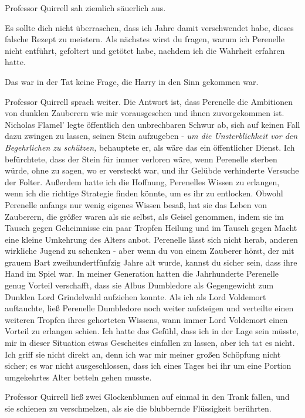 Professor Quirrell sah ziemlich säuerlich aus.

\glqq{}Es sollte dich nicht überraschen, dass ich Jahre damit verschwendet habe,
dieses falsche Rezept zu meistern. Als nächstes wirst du fragen, warum ich
Perenelle nicht entführt, gefoltert und getötet habe, nachdem ich die Wahrheit
erfahren hatte.\grqq{}

Das war in der Tat keine Frage, die Harry in den Sinn gekommen war.

Professor Quirrell sprach weiter. \glqq{}Die Antwort ist, dass Perenelle die
Ambitionen von dunklen Zauberern wie mir vorausgesehen und ihnen zuvorgekommen
ist. Nicholas Flamel' legte öffentlich den unbrechbaren Schwur ab, sich auf
keinen Fall dazu zwingen zu lassen, seinen Stein aufzugeben - \emph{um die
Unsterblichkeit vor den Begehrlichen zu schützen,} behauptete er, als wäre das
ein öffentlicher Dienst. Ich befürchtete, dass der Stein für immer verloren
wäre, wenn Perenelle sterben würde, ohne zu sagen, wo er versteckt war, und ihr
Gelübde verhinderte Versuche der Folter. Außerdem hatte ich die Hoffnung,
Perenelles Wissen zu erlangen, wenn ich die richtige Strategie finden könnte, um
es ihr zu entlocken. Obwohl Perenelle anfangs nur wenig eigenes Wissen besaß,
hat sie das Leben von Zauberern, die größer waren als sie selbst, als Geisel
genommen, indem sie im Tausch gegen Geheimnisse ein paar Tropfen Heilung und im
Tausch gegen Macht eine kleine Umkehrung des Alters anbot. Perenelle lässt sich
nicht herab, anderen wirkliche Jugend zu schenken - aber wenn du von einem
Zauberer hörst, der mit grauem Bart zweihundertfünfzig Jahre alt wurde, kannst
du sicher sein, dass ihre Hand im Spiel war. In meiner Generation hatten die
Jahrhunderte Perenelle genug Vorteil verschafft, dass sie Albus Dumbledore als
Gegengewicht zum Dunklen Lord Grindelwald aufziehen konnte. Als ich als Lord
Voldemort auftauchte, ließ Perenelle Dumbledore noch weiter aufsteigen und
verteilte einen weiteren Tropfen ihres gehorteten Wissens, wann immer Lord
Voldemort einen Vorteil zu erlangen schien. Ich hatte das Gefühl, dass ich in
der Lage sein müsste, mir in dieser Situation etwas Gescheites einfallen zu
lassen, aber ich tat es nicht. Ich griff sie nicht direkt an, denn ich war mir
meiner großen Schöpfung nicht sicher; es war nicht ausgeschlossen, dass ich
eines Tages bei ihr um eine Portion umgekehrtes Alter betteln gehen musste.\grqq{}

Professor Quirrell ließ zwei Glockenblumen auf einmal in den Trank fallen, und
sie schienen zu verschmelzen, als sie die blubbernde Flüssigkeit berührten.

